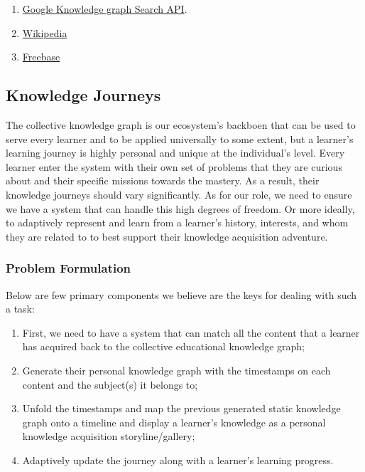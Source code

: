 \documentclass{acm_proc_article-sp}
\begin{document}
\begin{enumerate}
\def\labelenumi{\arabic{enumi}.}
\setcounter{enumi}{1}
\item
  \href{https://developers.google.com/knowledge-graph/\#knowledge_graph_entities}{Google
  Knowledge graph Search API}.
\item
  \href{wikipedia.com}{Wikipedia}
\item
  \href{Freebase.com}{Freebase}
\end{enumerate}

\subsection{Knowledge Journeys}\label{knowledge-journeys-1}

The collective knowledge graph is our ecosystem's backboen that can be
used to serve every learner and to be applied universally to some
extent, but a learner's learning journey is highly personal and unique
at the individual's level. Every learner enter the system with their own
set of problems that they are curious about and their specific missions
towards the mastery. As a result, their knowledge journeys should vary
significantly. As for our role, we need to ensure we have a system that
can handle this high degrees of freedom. Or more ideally, to adaptively
represent and learn from a learner's history, interests, and whom they
are related to to best support their knowledge acquisition adventure.

\subsubsection{Problem Formulation}\label{problem-formulation-3}

Below are few primary components we believe are the keys for dealing
with such a task:

\begin{enumerate}
\def\labelenumi{\arabic{enumi}.}
\item
  First, we need to have a system that can match all the content that a
  learner has acquired back to the collective educational knowledge
  graph;
\item
  Generate their personal knowledge graph with the timestamps on each
  content and the subject(s) it belongs to;
\item
  Unfold the timestamps and map the previous generated static knowledge
  graph onto a timeline and display a learner's knowledge as a personal
  knowledge acquisition storyline/gallery;
\item
  Adaptively update the journey along with a learner's learning
  progress.
\end{enumerate}
\end{document}
